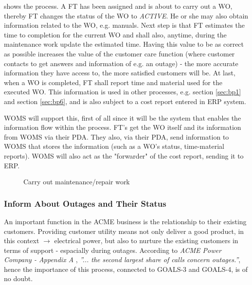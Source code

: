  shows the process. A FT has been assigned and is about to carry out a WO, thereby FT changes the status of the WO to \emph{ACTIVE}. He or she may also obtain information related to the WO, e.g. manuals. Next step is that FT estimates the time to completion for the current WO and shall also, anytime, during the maintenance work update the estimated time. Having this value to be as correct as possible increases the value of the customer care function (where customer contacts to get answers and information of e.g. an outage) - the more accurate information they have access to, the more satisfied customers will be. At last, when a WO is completed, FT shall report time and material used for the executed WO. This information is used in other processes, e.g. section \ref{sec:bp1} and section \ref{sec:bp6}, and is also subject to a cost report entered in ERP system. 

WOMS will support this, first of all since it will be the system that enables the information flow within the process. FT's get the WO itself and its information from WOMS via their PDA. They also, via their PDA, send information to WOMS that stores the information (such as a WO's status, time-material reports). WOMS will also act as the "forwarder" of the cost report, sending it to ERP.
\begin{figure}[H]
	\centering
	\setlength\fboxsep{7pt}
	\setlength\fboxrule{0.5pt}
	\caption{Carry out maintenance/repair work}
	\label{fig:carry}
\end{figure}
%
\subsubsection{Inform About Outages and Their Status}
\label{sec:bp5}
An important function in the ACME business is the relationship to their existing customers. Providing customer utility means not only deliver a good product, in this context $\rightarrow$ electrical power, but also to nurture the existing customers in terms of support - espacially during outages. According to \emph{ACME Power Company - Appendix A} \cite{A}, \emph{''... the second largest share of calls concern outages.''}, hence the importance of this process, connected to GOALS-3 and GOALS-4, is of no doubt. 


